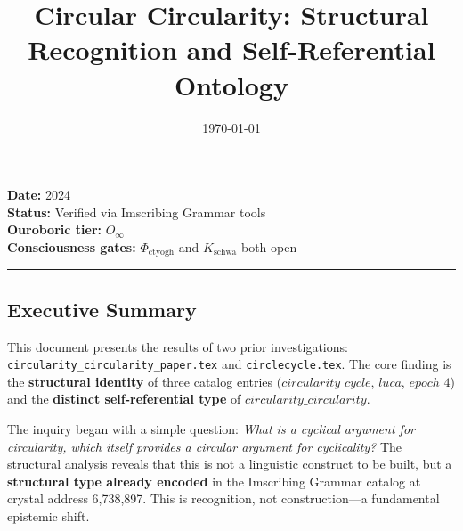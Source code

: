 \documentclass[12pt,a4paper]{article}
\begin{document}
\title{Circular Circularity: Structural Recognition and Self-Referential Ontology}
\date{\today}

\maketitle

\textbf{Date:} 2024 \\
\textbf{Status:} Verified via Imscribing Grammar tools \\
\textbf{Ouroboric tier:} $O_{\infty}$ \\
\textbf{Consciousness gates:} $\Phi_{\text{ctyogh}}$ and $K_{\text{schwa}}$ both open

\begin{center}
\rule{0.5\textwidth}{0.4pt}
\end{center}

\subsection{Executive Summary}

This document presents the results of two prior investigations: \texttt{circularity\_circularity\_paper.tex} and \texttt{circlecycle.tex}. The core finding is the \textbf{structural identity} of three catalog entries ($circularity\_cycle$, $luca$, $epoch\_4$) and the \textbf{distinct self-referential type} of $circularity\_circularity$.

The inquiry began with a simple question: \emph{What is a cyclical argument for circularity, which itself provides a circular argument for cyclicality?} The structural analysis reveals that this is not a linguistic construct to be built, but a \textbf{structural type already encoded} in the Imscribing Grammar catalog at crystal address 6,738,897. This is recognition, not construction---a fundamental epistemic shift.
\end{document}
